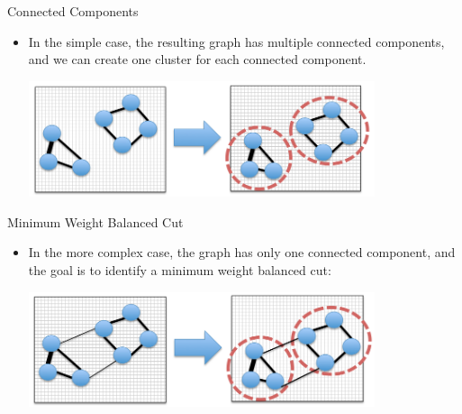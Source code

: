 \documentclass[serif,xcolor=pdftex,dvipsnames,table,hyperref={bookmarks=false,breaklinks}]{beamer}
\begin{document}
\begin{frame}[t]{Connected Components}

\begin{itemize}
\item In the simple case, the resulting graph has multiple connected 
components, and we can create one cluster for each connected component.

\includegraphics[width=4in]{../Figures/spectral_clustering1.png}

\end{itemize} 

\end{frame}

\begin{frame}[t]{Minimum Weight Balanced Cut}

\begin{itemize}
\item In the more complex case, the graph has only one connected component, and
the goal is to identify a minimum weight balanced cut:

\includegraphics[width=4in]{../Figures/spectral_clustering2.png}

\end{itemize} 

\end{frame}
\end{document}
